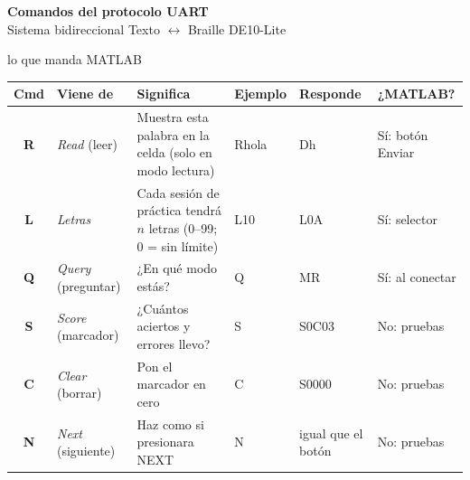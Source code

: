 \documentclass[11pt,a4paper]{article}
\begin{document}
\begin{center}
{\color{tinta}\LARGE\bfseries Comandos del protocolo UART}\\[3pt]
{\color{gris}Sistema bidireccional Texto $\leftrightarrow$ Braille \textendash{} DE10-Lite}
\end{center}
\vspace{6pt}

\hfill{\small\color{gris}lo que manda MATLAB}\par
\vspace{4pt}
\noindent{}
\begin{tabularx}{\linewidth}{>{\ttfamily\bfseries\large}c >{\raggedright}p{2.2cm} L >{\ttfamily}p{1.6cm} >{\ttfamily\raggedright}p{1.7cm} >{\raggedright\arraybackslash}p{2.3cm}}
\toprule
{}\normalfont\normalsize\textbf{Cmd} & \textbf{Viene de} & \textbf{Significa} & \normalfont\textbf{Ejemplo} & \normalfont\textbf{Responde} & \textbf{¿MATLAB?} \\
\midrule
R & \textit{Read} (leer) & Muestra esta palabra en la celda (solo en modo lectura) & Rhola & Dh & Sí: botón Enviar \\
L & \textit{Letras} & Cada sesión de práctica tendrá $n$ letras (0--99; 0 = sin límite) & L10 & L0A & Sí: selector \\
Q & \textit{Query} (preguntar) & ¿En qué modo estás? & Q & MR & Sí: al conectar \\
S & \textit{Score} (marcador) & ¿Cuántos aciertos y errores llevo? & S & S0C03 & No: pruebas \\
C & \textit{Clear} (borrar) & Pon el marcador en cero & C & S0000 & No: pruebas \\
N & \textit{Next} (siguiente) & Haz como si presionara NEXT & N & \normalfont igual que el botón & No: pruebas \\
\bottomrule
\end{tabularx}
\end{document}
